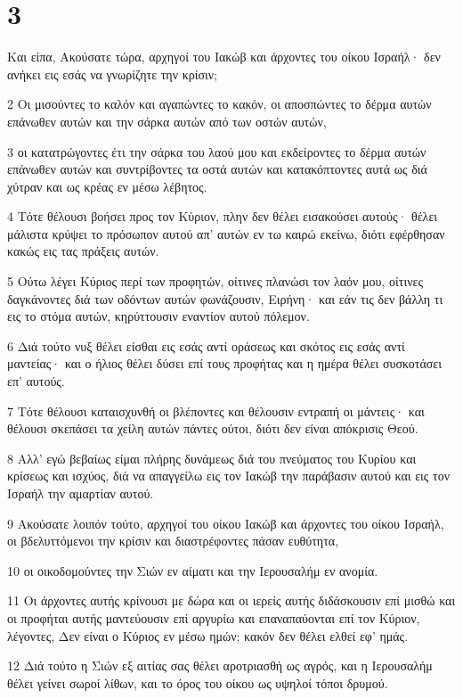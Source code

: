\chapter{3}

\par Και είπα, Ακούσατε τώρα, αρχηγοί του Ιακώβ και άρχοντες του οίκου Ισραήλ· δεν ανήκει εις εσάς να γνωρίζητε την κρίσιν;
\par 2 Οι μισούντες το καλόν και αγαπώντες το κακόν, οι αποσπώντες το δέρμα αυτών επάνωθεν αυτών και την σάρκα αυτών από των οστών αυτών,
\par 3 οι κατατρώγοντες έτι την σάρκα του λαού μου και εκδείροντες το δέρμα αυτών επάνωθεν αυτών και συντρίβοντες τα οστά αυτών και κατακόπτοντες αυτά ως διά χύτραν και ως κρέας εν μέσω λέβητος.
\par 4 Τότε θέλουσι βοήσει προς τον Κύριον, πλην δεν θέλει εισακούσει αυτούς· θέλει μάλιστα κρύψει το πρόσωπον αυτού απ' αυτών εν τω καιρώ εκείνω, διότι εφέρθησαν κακώς εις τας πράξεις αυτών.
\par 5 Ούτω λέγει Κύριος περί των προφητών, οίτινες πλανώσι τον λαόν μου, οίτινες δαγκάνοντες διά των οδόντων αυτών φωνάζουσιν, Ειρήνη· και εάν τις δεν βάλλη τι εις το στόμα αυτών, κηρύττουσιν εναντίον αυτού πόλεμον.
\par 6 Διά τούτο νυξ θέλει είσθαι εις εσάς αντί οράσεως και σκότος εις εσάς αντί μαντείας· και ο ήλιος θέλει δύσει επί τους προφήτας και η ημέρα θέλει συσκοτάσει επ' αυτούς.
\par 7 Τότε θέλουσι καταισχυνθή οι βλέποντες και θέλουσιν εντραπή οι μάντεις· και θέλουσι σκεπάσει τα χείλη αυτών πάντες ούτοι, διότι δεν είναι απόκρισις Θεού.
\par 8 Αλλ' εγώ βεβαίως είμαι πλήρης δυνάμεως διά του πνεύματος του Κυρίου και κρίσεως και ισχύος, διά να απαγγείλω εις τον Ιακώβ την παράβασιν αυτού και εις τον Ισραήλ την αμαρτίαν αυτού.
\par 9 Ακούσατε λοιπόν τούτο, αρχηγοί του οίκου Ιακώβ και άρχοντες του οίκου Ισραήλ, οι βδελυττόμενοι την κρίσιν και διαστρέφοντες πάσαν ευθύτητα,
\par 10 οι οικοδομούντες την Σιών εν αίματι και την Ιερουσαλήμ εν ανομία.
\par 11 Οι άρχοντες αυτής κρίνουσι με δώρα και οι ιερείς αυτής διδάσκουσιν επί μισθώ και οι προφήται αυτής μαντεύουσιν επί αργυρίω και επαναπαύονται επί τον Κύριον, λέγοντες, Δεν είναι ο Κύριος εν μέσω ημών; κακόν δεν θέλει ελθεί εφ' ημάς.
\par 12 Διά τούτο η Σιών εξ αιτίας σας θέλει αροτριασθή ως αγρός, και η Ιερουσαλήμ θέλει γείνει σωροί λίθων, και το όρος του οίκου ως υψηλοί τόποι δρυμού.

